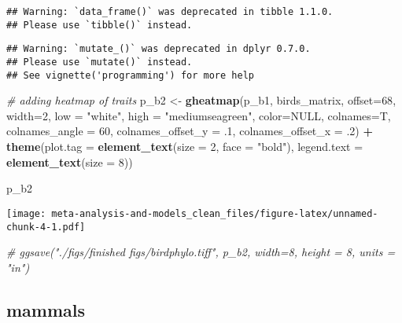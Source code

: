 \documentclass[]{article}
\newenvironment{Shaded}{\begin{snugshade}}{\end{snugshade}}
\newcommand{\KeywordTok}[1]{\textcolor[rgb]{0.13,0.29,0.53}{\textbf{#1}}}
\newcommand{\DataTypeTok}[1]{\textcolor[rgb]{0.13,0.29,0.53}{#1}}
\newcommand{\DecValTok}[1]{\textcolor[rgb]{0.00,0.00,0.81}{#1}}
\newcommand{\StringTok}[1]{\textcolor[rgb]{0.31,0.60,0.02}{#1}}
\newcommand{\CommentTok}[1]{\textcolor[rgb]{0.56,0.35,0.01}{\textit{#1}}}
\newcommand{\OtherTok}[1]{\textcolor[rgb]{0.56,0.35,0.01}{#1}}
\newcommand{\OperatorTok}[1]{\textcolor[rgb]{0.81,0.36,0.00}{\textbf{#1}}}
\newcommand{\NormalTok}[1]{#1}
\begin{document}
\begin{verbatim}
## Warning: `data_frame()` was deprecated in tibble 1.1.0.
## Please use `tibble()` instead.
\end{verbatim}

\begin{verbatim}
## Warning: `mutate_()` was deprecated in dplyr 0.7.0.
## Please use `mutate()` instead.
## See vignette('programming') for more help
\end{verbatim}

\begin{Shaded}
\begin{Highlighting}[]
  \CommentTok{# adding heatmap of traits}
\NormalTok{p_b2 <-}\StringTok{ }\KeywordTok{gheatmap}\NormalTok{(p_b1, birds_matrix, }\DataTypeTok{offset=}\DecValTok{68}\NormalTok{, }\DataTypeTok{width=}\DecValTok{2}\NormalTok{, }\DataTypeTok{low =} \StringTok{"white"}\NormalTok{, }\DataTypeTok{high =} \StringTok{"mediumseagreen"}\NormalTok{, }\DataTypeTok{color=}\OtherTok{NULL}\NormalTok{,}
                 \DataTypeTok{colnames=}\NormalTok{T, }\DataTypeTok{colnames_angle =} \DecValTok{60}\NormalTok{, }\DataTypeTok{colnames_offset_y =}\NormalTok{ .}\DecValTok{1}\NormalTok{, }\DataTypeTok{colnames_offset_x =}\NormalTok{ .}\DecValTok{2}\NormalTok{) }\OperatorTok{+}
\StringTok{  }\KeywordTok{theme}\NormalTok{(}\DataTypeTok{plot.tag =} \KeywordTok{element_text}\NormalTok{(}\DataTypeTok{size =} \DecValTok{2}\NormalTok{, }\DataTypeTok{face =} \StringTok{"bold"}\NormalTok{),}
        \DataTypeTok{legend.text =} \KeywordTok{element_text}\NormalTok{(}\DataTypeTok{size =} \DecValTok{8}\NormalTok{))}

\NormalTok{p_b2}
\end{Highlighting}
\end{Shaded}

\texttt{[image: meta-analysis-and-models\_clean\_files/figure-latex/unnamed-chunk-4-1.pdf]}

\begin{Shaded}
\begin{Highlighting}[]
\CommentTok{# ggsave("./figs/finished figs/birdphylo.tiff", p_b2, width=8, height = 8, units = "in")}
\end{Highlighting}
\end{Shaded}

\subsection{mammals}\label{mammals-1}
\end{document}

